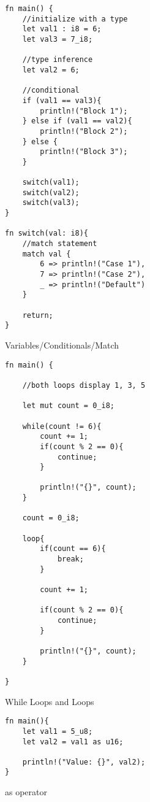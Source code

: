\documentclass[sigconf,authorversion,nonacm]{acmart}
\begin{document}
\begin{figure} [H]
\caption{Variables/Conditionals/Match}
    \begin{lstlisting}
fn main() {
    //initialize with a type
    let val1 : i8 = 6;
    let val3 = 7_i8;

    //type inference
    let val2 = 6;
    
    //conditional
    if (val1 == val3){
        println!("Block 1");
    } else if (val1 == val2){
        println!("Block 2");
    } else {
        println!("Block 3");
    }

    switch(val1);
    switch(val2);
    switch(val3);
}

fn switch(val: i8){
    //match statement
    match val {
        6 => println!("Case 1"),
        7 => println!("Case 2"),
        _ => println!("Default")
    }

    return;
}
    \end{lstlisting}
\end{figure}

\begin{figure} [H] 
\caption{While Loops and Loops}
    \begin{lstlisting}
fn main() {

    //both loops display 1, 3, 5

    let mut count = 0_i8;

    while(count != 6){
        count += 1;
        if(count % 2 == 0){
            continue;
        }

        println!("{}", count);
    }

    count = 0_i8;
    
    loop{
        if(count == 6){
            break;
        }

        count += 1;

        if(count % 2 == 0){
            continue;
        }

        println!("{}", count);
    }

}
    \end{lstlisting}
\end{figure}

\begin{figure} [H]
\caption{as operator}
    \begin{lstlisting}
fn main(){
    let val1 = 5_u8;
    let val2 = val1 as u16;

    println!("Value: {}", val2);
}
    \end{lstlisting}
\end{figure}
\end{document}
